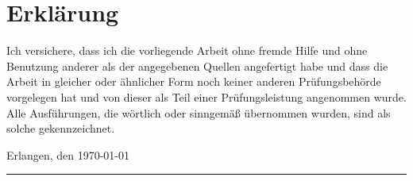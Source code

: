 \chapter*{Erklärung}
\thispagestyle{empty}
Ich versichere, dass ich die vorliegende Arbeit ohne fremde Hilfe und ohne Benutzung anderer als
der angegebenen Quellen angefertigt habe und dass die Arbeit in gleicher oder
ähnlicher Form noch keiner anderen Prüfungsbehörde vorgelegen hat und von dieser
als Teil einer Prüfungsleistung angenommen wurde. Alle Ausführungen, die
wörtlich oder sinngemäß übernommen wurden, sind als solche gekennzeichnet.\\
\vspace{2cm}

Erlangen, den \today\\[-5mm]
\hspace*{9cm}\rule[-0.3pt]{0.35\linewidth}{0.4pt}\\[0mm]
\hspace*{10.4cm}\NAME

\newpage
\thispagestyle{empty}
\mbox{ }
\newpage